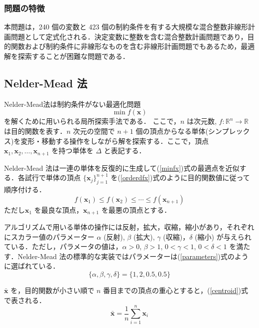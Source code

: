 \documentclass[twocolumn]{jarticle}
\begin{document}
    \subsubsection{問題の特徴}
    本問題は，240 個の変数と 423 個の制約条件を有する大規模な混合整数非線形計画問題として定式化される．決定変数に整数を含む混合整数計画問題であり，目的関数および制約条件に非線形なものを含む非線形計画問題でもあるため，最適解を探索することが困難な問題である．
    
    \subsection{Nelder-Mead 法}
    Nelder-Mead法\cite{10.1093/comjnl/7.4.308}は制約条件がない最適化問題
    \begin{equation}
        \label{minfx}
        \min f(\bm{x})
    \end{equation}
    を解くために用いられる局所探索手法である．%
    ここで，$n$ は次元数, $f: \mathbb{R}^n \rightarrow \mathbb{R}$ は目的関数を表す．$n$ 次元の空間で $n+1$ 個の頂点からなる単体(シンプレックス)を変形・移動する操作をしながら解を探索する．ここで，頂点 $\bm{x}_1, \bm{x}_2, \dots , \bm{x}_{n+1}$ を持つ単体を $\Delta$ と表記する． 
    
    Nelder-Mead 法は一連の単体を反復的に生成して(\ref{minfx})式の最適点を近似する．各試行で単体の頂点 $\{\bm{x}_j\}_{j=1}^{n+1}$ を(\ref{orderdfx})式のように目的関数値に従って順序付ける．
    \begin{equation}
        \label{orderdfx}
        f(\bm{x}_1) \leq f(\bm{x}_2) \leq \cdots \leq f(\bm{x}_{n+1})
    \end{equation}
    ただし$\bm{x}_1$ を最良な頂点，$\bm{x}_{n+1}$ を最悪の頂点とする．

    アルゴリズムで用いる単体の操作には反射，拡大，収縮，縮小があり，それぞれにスカラー値のパラメーター $\alpha$ (反射), $\beta$ (拡大), $\gamma$ (収縮)，$\delta$ (縮小) が与えられている．ただし，パラメータの値は，$\alpha > 0$, $\beta > 1$, $0 < \gamma < 1$, $0 < \delta < 1$ を満たす．Nelder-Mead 法の標準的な実装ではパラメーターは(\ref{parameters})式のように選ばれている．
    \begin{equation}
        \label{parameters}
        \{\alpha, \beta, \gamma, \delta\} = \{1, 2, 0.5, 0.5\}
    \end{equation}
    
    $\bar{\bm{x}}$ を，目的関数が小さい順で $n$ 番目までの頂点の重心とすると，(\ref{centroid})式で表される．
    \begin{equation}
        \label{centroid}
        \bar{\bm{x}} = \frac{1}{n}\sum_{i=1}^n\bm{x}_i
    \end{equation}
\end{document}
